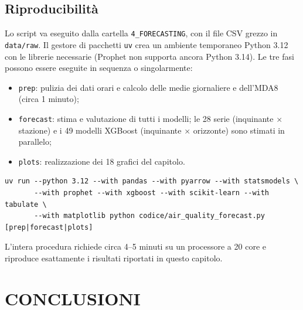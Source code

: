 \documentclass[11pt]{report}
\begin{document}
\section{Riproducibilità}
\label{sec:fc_riproducibilita}

Lo script va eseguito dalla cartella \texttt{4\_FORECASTING}, con il file CSV grezzo
in \texttt{data/raw}. Il gestore di pacchetti \texttt{uv} crea un ambiente
temporaneo Python 3.12 con le librerie necessarie (Prophet non supporta ancora
Python 3.14). Le tre fasi possono essere eseguite in sequenza o singolarmente:
\begin{itemize}
  \item \texttt{prep}: pulizia dei dati orari e calcolo delle medie giornaliere e
        dell'MDA8 (circa 1 minuto);
  \item \texttt{forecast}: stima e valutazione di tutti i modelli; le 28 serie
        (inquinante $\times$ stazione) e i 49 modelli XGBoost (inquinante $\times$
        orizzonte) sono stimati in parallelo;
  \item \texttt{plots}: realizzazione dei 18 grafici del capitolo.
\end{itemize}

\begin{lstlisting}[basicstyle=\ttfamily\footnotesize]
uv run --python 3.12 --with pandas --with pyarrow --with statsmodels \
       --with prophet --with xgboost --with scikit-learn --with tabulate \
       --with matplotlib python codice/air_quality_forecast.py [prep|forecast|plots]
\end{lstlisting}

L'intera procedura richiede circa 4--5 minuti su un processore a 20 core e
riproduce esattamente i risultati riportati in questo capitolo.


\chapter{CONCLUSIONI}



\end{document}
